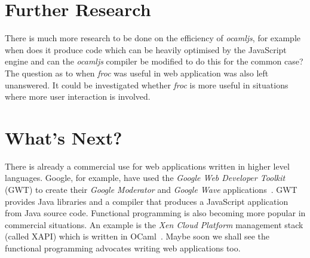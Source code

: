 \section{Further Research}
There is much more research to be done on the efficiency of \emph{ocamljs}, for example when does it produce code which can be heavily optimised by the JavaScript engine and can the \emph{ocamljs} compiler be modified to do this for the common case? The question as to when \emph{froc} was useful in web application was also left unanswered. It could be investigated whether \emph{froc} is more useful in situations where more user interaction is involved.

\section{What's Next?}
There is already a commercial use for web applications written in higher level languages. Google, for example, have used the \emph{Google Web Developer Toolkit} (GWT) to create their \emph{Google Moderator} and \emph{Google Wave} applications~\cite{bib:gwt}. GWT provides Java libraries and a compiler that produces a JavaScript application from Java source code. Functional programming is also becoming more popular in commercial situations. An example is the \emph{Xen Cloud Platform} management stack (called XAPI) which is written in OCaml~\cite{bib:xapi}. Maybe soon we shall see the functional programming advocates writing web applications too.
